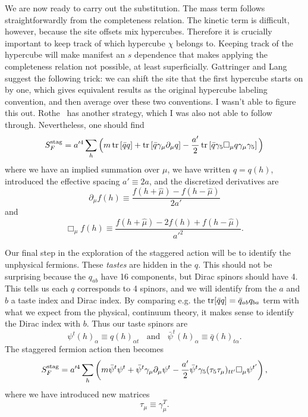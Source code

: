 We are now ready to carry out the substitution. The mass term follows
straightforwardly from the completeness relation. The kinetic term is
difficult, however, because the site offsets mix hypercubes. Therefore
it is crucially important to keep track of which hypercube $\chi$
belongs to. Keeping track of the hypercube will make manifest an $s$
dependence that makes applying the completeness relation not possible,
at least superficially. Gattringer and Lang~\cite{gattringer_quantum_2010}
suggest the following trick: we can shift the site that the first
hypercube starts on by one, which gives equivalent results as the
original hypercube labeling convention, and then average over these
two conventions. I wasn't able to figure this out. 
Rothe~\cite{rothe_lattice_2005} has another strategy, which I was also
not able to follow through. Nevertheless, one should find
\begin{equation}
S_F^{\rm stag}=a'^4\sum_h\Big(m\tr\left[\bar{q}q\right]
+\tr\left[\bar{q}\gamma_\mu\partial_\mu q\right]
-\frac{a'}{2}\tr\left[\bar{q}\gamma_5\Box_\mu q\gamma_\mu\gamma_5\right]\Big)
\end{equation}
where we have an implied summation over $\mu$, we have written
$q=q(h)$, introduced the effective spacing $a'\equiv2a$, and 
the discretized derivatives are
\begin{equation}
  \partial_\mu f(h)\equiv\frac{f(h+\hat{\mu})-f(h-\hat{\mu})}{2a'}
\end{equation}
and
\begin{equation}
  \Box_\mu f(h)\equiv\frac{f(h+\hat{\mu})-2f(h)+f(h-\hat{\mu})}{a'^2}.
\end{equation}

Our final step in the exploration of the staggered action will be to
identify the unphysical fermions. These {\it tastes} are hidden in
the $q$. This should not be surprising because the $q_{ab}$ have 16
components, but Dirac spinors should have 4. This
tells us each $q$ corresponds to 4 spinors, and we will identify from
the $a$ and $b$ a taste index and Dirac index.
By comparing e.g. the $\tr[\bar{q}q]=\bar{q}_{ab}q_{ba}$ term with
what we expect from the physical, continuum theory, it makes sense
to identify the Dirac index with $b$. Thus our taste spinors are
\begin{equation}
  \psi^{t}(h)_\alpha\equiv q(h)_{\alpha t}~~~~\text{and}~~~~
  \bar{\psi}^{t}(h)_\alpha\equiv \bar{q}(h)_{t\alpha}.
\end{equation}
The staggered fermion action then becomes
\begin{equation}\label{eq:staggPhys}
S_F^{\rm stag}=a'^4\sum_h\left(
m\bar{\psi}^{t}\psi^{t}
+\bar{\psi}^{t}\gamma_\mu\partial_\mu\psi^{t}
-\frac{a'}{2}\bar{\psi}^{t}\gamma_5(\tau_5\tau_\mu)_{tt'}\Box_\mu\psi^{t'}
\right),
\end{equation}
where we have introduced new matrices
\begin{equation}
\tau_\mu\equiv\gamma_\mu^T.
\end{equation}

